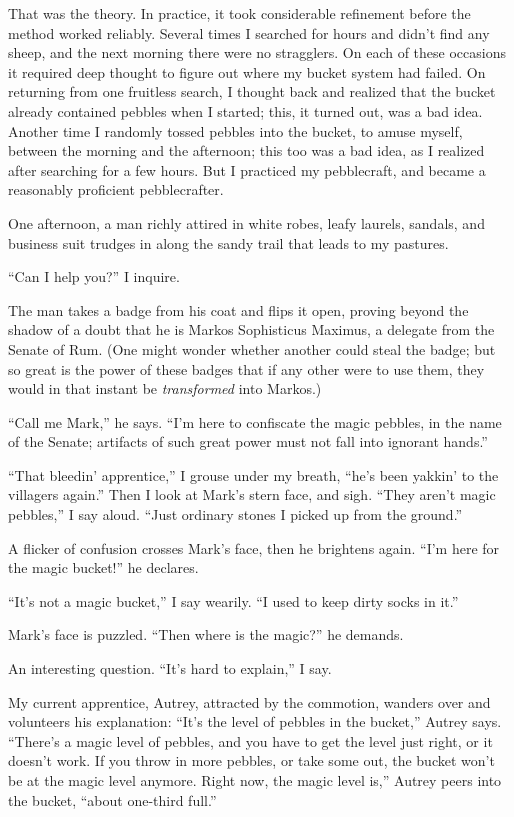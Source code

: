 {
 That was the theory. In practice, it took considerable refinement
before the method worked reliably. Several times I searched for hours
and didn't find any sheep, and the next morning there
were no stragglers. On each of these occasions it required deep thought
to figure out where my bucket system had failed. On returning from one
fruitless search, I thought back and realized that the bucket already
contained pebbles when I started; this, it turned out, was a bad idea.
Another time I randomly tossed pebbles into the bucket, to amuse
myself, between the morning and the afternoon; this too was a bad idea,
as I realized after searching for a few hours. But I practiced my
pebblecraft, and became a reasonably proficient pebblecrafter.}

{
 One afternoon, a man richly attired in white robes, leafy laurels,
sandals, and business suit trudges in along the sandy trail that leads
to my pastures.}

{
 ``Can I help you?'' I inquire.}

{
 The man takes a badge from his coat and flips it open, proving
beyond the shadow of a doubt that he is Markos Sophisticus Maximus, a
delegate from the Senate of Rum. (One might wonder whether another
could steal the badge; but so great is the power of these badges that
if any other were to use them, they would in that instant be
\textit{transformed} into Markos.)}

{
 ``Call me Mark,'' he says.
``I'm here to confiscate the magic
pebbles, in the name of the Senate; artifacts of such great power must
not fall into ignorant hands.''}

{
 ``That bleedin'
apprentice,'' I grouse under my breath,
``he's been yakkin' to
the villagers again.'' Then I look at
Mark's stern face, and sigh. ``They
aren't magic pebbles,'' I say aloud.
``Just ordinary stones I picked up from the
ground.''}

{
 A flicker of confusion crosses Mark's face, then
he brightens again. ``I'm here for the
magic bucket!'' he declares.}

{
 ``It's not a magic
bucket,'' I say wearily. ``I used to
keep dirty socks in it.''}

{
 Mark's face is puzzled. ``Then
where is the magic?'' he demands.}

{
 An interesting question. ``It's
hard to explain,'' I say.}

{
 My current apprentice, Autrey, attracted by the commotion, wanders
over and volunteers his explanation:
``It's the level of pebbles in the
bucket,'' Autrey says.
``There's a magic level of pebbles,
and you have to get the level just right, or it doesn't
work. If you throw in more pebbles, or take some out, the bucket
won't be at the magic level anymore. Right now, the
magic level is,'' Autrey peers into the bucket,
``about one-third full.''}


